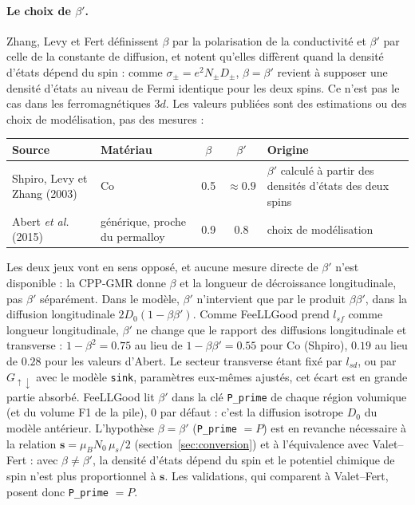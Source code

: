 \documentclass[11pt,a4paper]{article}
\newcommand{\vs}{\bm{s}}
\begin{document}
\paragraph{Le choix de $\beta'$.} Zhang, Levy et Fert définissent
$\beta$ par la polarisation de la conductivité et $\beta'$ par celle de la
constante de diffusion, et notent qu'elles diffèrent quand la densité
d'états dépend du spin : comme $\sigma_\pm = e^2N_\pm D_\pm$,
$\beta=\beta'$ revient à supposer une densité d'états au niveau de Fermi
identique pour les deux spins. Ce n'est pas le cas dans les ferromagnétiques
$3d$. Les valeurs publiées sont des estimations ou des choix de
modélisation, pas des mesures :
\begin{center}
\renewcommand{\arraystretch}{1.2}
\begin{tabular}{>{\raggedright}p{4.6cm}>{\raggedright}p{2.6cm}cc>{\raggedright\arraybackslash}p{4.0cm}}
  \toprule
  Source & Matériau & $\beta$ & $\beta'$ & Origine \\
  \midrule
  Shpiro, Levy et Zhang (2003) & Co & 0.5 & $\approx0.9$ & $\beta'$ calculé à
    partir des densités d'états des deux spins \\
  Abert \emph{et al.} (2015) & générique, proche du permalloy & 0.9 & 0.8 &
    choix de modélisation \\
  \bottomrule
\end{tabular}
\end{center}
Les deux jeux vont en sens opposé, et aucune mesure directe de $\beta'$
n'est disponible : la CPP-GMR donne $\beta$ et la longueur de décroissance
longitudinale, pas $\beta'$ séparément. Dans le modèle, $\beta'$ n'intervient
que par le produit $\beta\beta'$, dans la diffusion longitudinale
$2D_0(1-\beta\beta')$. Comme FeeLLGood prend $l_{sf}$ comme longueur
longitudinale, $\beta'$ ne change que le rapport des diffusions
longitudinale et transverse : $1-\beta^2 = 0.75$ au lieu de
$1-\beta\beta' = 0.55$ pour Co (Shpiro), $0.19$ au lieu de $0.28$ pour les
valeurs d'Abert. Le secteur transverse étant fixé par $l_{sd}$, ou par
$G_{\uparrow\downarrow}$ avec le modèle \texttt{sink}, paramètres eux-mêmes
ajustés, cet écart est en grande partie absorbé. FeeLLGood lit $\beta'$
dans la clé \texttt{P\_prime} de chaque région volumique (et du volume F1
de la pile), 0 par défaut : c'est la diffusion isotrope $D_0$ du modèle
antérieur. L'hypothèse $\beta=\beta'$ (\texttt{P\_prime} $=P$) est en
revanche nécessaire à la relation $\vs = \mu_BN_0\,\mu_s/2$
(section~\ref{sec:conversion}) et à l'équivalence avec Valet--Fert : avec
$\beta\neq\beta'$, la densité d'états dépend du spin et le potentiel
chimique de spin n'est plus proportionnel à $\vs$. Les validations, qui
comparent à Valet--Fert, posent donc \texttt{P\_prime} $=P$.
\end{document}
